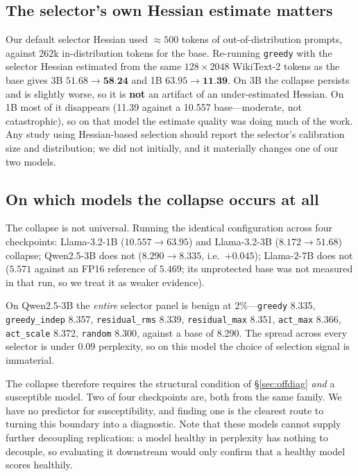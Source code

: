 \documentclass[11pt]{article}
\newcommand{\best}[1]{\textbf{#1}}
\begin{document}
\subsection{The selector's own Hessian estimate matters}
\label{sec:selectorH}

Our default selector Hessian used ${\approx}500$ tokens of out-of-distribution prompts, against
262k in-distribution tokens for the base. Re-running \texttt{greedy} with the selector Hessian
estimated from the same $128 \times 2048$ WikiText-2 tokens as the base gives 3B
$51.68 \rightarrow \best{58.24}$ and 1B $63.95 \rightarrow \best{11.39}$. On 3B the collapse
persists and is slightly worse, so it is \textbf{not} an artifact of an under-estimated Hessian.
On 1B most of it disappears (11.39 against a 10.557 base---moderate, not catastrophic), so on
that model the estimate quality was doing much of the work. Any study using Hessian-based
selection should report the selector's calibration size and distribution; we did not initially,
and it materially changes one of our two models.

\subsection{On which models the collapse occurs at all}
\label{sec:scope}

The collapse is not universal. Running the identical configuration across four checkpoints:
Llama-3.2-1B ($10.557 \rightarrow 63.95$) and Llama-3.2-3B ($8.172 \rightarrow 51.68$) collapse;
Qwen2.5-3B does not ($8.290 \rightarrow 8.335$, i.e.\ $+0.045$); Llama-2-7B does not
($5.571$ against an FP16 reference of $5.469$; its unprotected base was not measured in that
run, so we treat it as weaker evidence).

On Qwen2.5-3B the \emph{entire} selector panel is benign at 2\%---\texttt{greedy} 8.335,
\texttt{greedy\_indep} 8.357, \texttt{residual\_rms} 8.339, \texttt{residual\_max} 8.351,
\texttt{act\_max} 8.366, \texttt{act\_scale} 8.372, \texttt{random} 8.300, against a base of
8.290. The spread across every selector is under 0.09 perplexity, so on this model the choice of
selection signal is immaterial.

The collapse therefore requires the structural condition of \S\ref{sec:offdiag} \emph{and} a
susceptible model. Two of four checkpoints are, both from the same family. We have no predictor
for susceptibility, and finding one is the clearest route to turning this boundary into a
diagnostic. Note that these models cannot supply further decoupling replication: a model healthy
in perplexity has nothing to decouple, so evaluating it downstream would only confirm that a
healthy model scores healthily.
\end{document}
